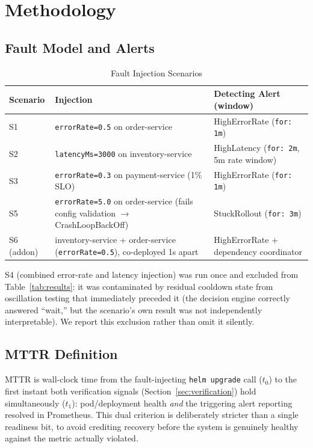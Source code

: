 \documentclass[conference]{IEEEtran}
\begin{document}
\section{Methodology}

\subsection{Fault Model and Alerts}
\begin{table}[h]
\centering
\footnotesize
\caption{Fault Injection Scenarios}
\label{tab:scenarios}
\begin{tabular}{@{}p{1.5cm}p{3.3cm}p{2.6cm}@{}}
\toprule
\textbf{Scenario} & \textbf{Injection} & \textbf{Detecting Alert (window)} \\
\midrule
S1 & \texttt{errorRate=0.5} on order-service & HighErrorRate (\texttt{for: 1m}) \\
S2 & \texttt{latencyMs=3000} on inventory-service & HighLatency (\texttt{for: 2m}, 5m rate window) \\
S3 & \texttt{errorRate=0.3} on payment-service (1\% SLO) & HighErrorRate (\texttt{for: 1m}) \\
S5 & \texttt{errorRate=5.0} on order-service (fails config validation $\rightarrow$ CrashLoopBackOff) & StuckRollout (\texttt{for: 3m}) \\
S6 (addon) & inventory-service + order-service (\texttt{errorRate=0.5}), co-deployed 1s apart & HighErrorRate + dependency coordinator \\
\bottomrule
\end{tabular}
\end{table}
S4 (combined error-rate and latency injection) was run once and excluded from Table~\ref{tab:results}: it was contaminated by residual cooldown state from oscillation testing that immediately preceded it (the decision engine correctly answered ``wait,'' but the scenario's own result was not independently interpretable). We report this exclusion rather than omit it silently.

\subsection{MTTR Definition}
MTTR is wall-clock time from the fault-injecting \texttt{helm upgrade} call ($t_0$) to the first instant both verification signals (Section~\ref{sec:verification}) hold simultaneously ($t_1$): pod/deployment health \emph{and} the triggering alert reporting resolved in Prometheus. This dual criterion is deliberately stricter than a single readiness bit, to avoid crediting recovery before the system is genuinely healthy against the metric actually violated.
\end{document}
